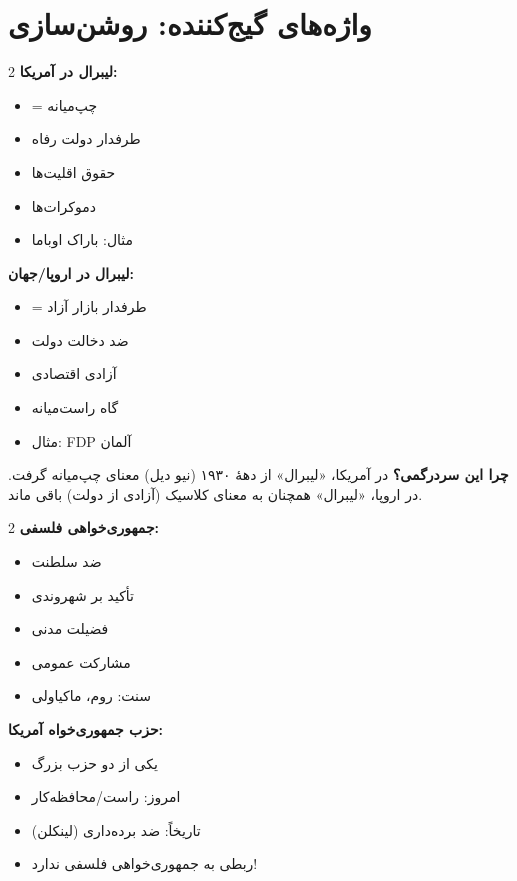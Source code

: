 \section*{واژه‌های گیج‌کننده: روشن‌سازی}

\begin{tcolorbox}[
    enhanced,
    colback=goldaccent!10,
    colframe=goldaccent,
    boxrule=1.5pt,
    arc=5pt,
    fonttitle=\bfseries,
    title={\rl{🟡 لیبرال: دو معنای متفاوت}}
]
\begin{multicols}{2}
\textbf{لیبرال در آمریکا:}
\begin{itemize}
    \item = چپ‌میانه
    \item طرفدار دولت رفاه
    \item حقوق اقلیت‌ها
    \item دموکرات‌ها
    \item مثال: باراک اوباما
\end{itemize}

\columnbreak

\textbf{لیبرال در اروپا/جهان:}
\begin{itemize}
    \item = طرفدار بازار آزاد
    \item ضد دخالت دولت
    \item آزادی اقتصادی
    \item گاه راست‌میانه
    \item مثال: FDP آلمان
\end{itemize}
\end{multicols}

\textbf{چرا این سردرگمی؟} در آمریکا، «لیبرال» از دههٔ ۱۹۳۰ (نیو دیل) معنای چپ‌میانه گرفت. در اروپا، «لیبرال» همچنان به معنای کلاسیک (آزادی از دولت) باقی ماند.
\end{tcolorbox}

\begin{tcolorbox}[
    enhanced,
    colback=goldaccent!10,
    colframe=goldaccent,
    boxrule=1.5pt,
    arc=5pt,
    fonttitle=\bfseries,
    title={\rl{🟡 جمهوری‌خواه: دو معنا}}
]
\begin{multicols}{2}
\textbf{جمهوری‌خواهی فلسفی:}
\begin{itemize}
    \item ضد سلطنت
    \item تأکید بر شهروندی
    \item فضیلت مدنی
    \item مشارکت عمومی
    \item سنت: روم، ماکیاولی
\end{itemize}

\columnbreak

\textbf{حزب جمهوری‌خواه آمریکا:}
\begin{itemize}
    \item یکی از دو حزب بزرگ
    \item امروز: راست/محافظه‌کار
    \item تاریخاً: ضد برده‌داری (لینکلن)
    \item ربطی به جمهوری‌خواهی فلسفی ندارد!
\end{itemize}
\end{multicols}
\end{tcolorbox}


